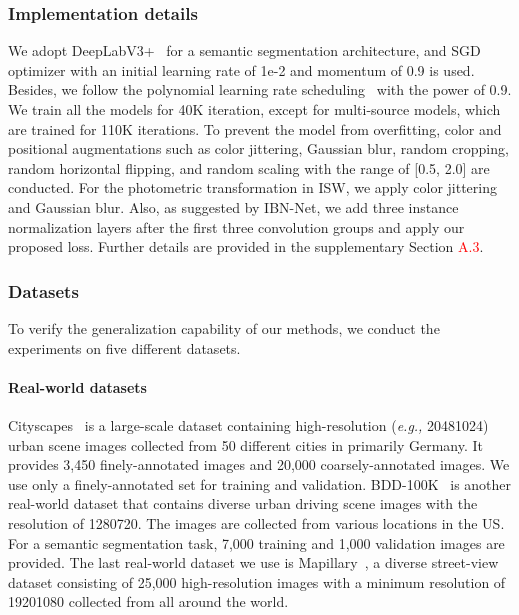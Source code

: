 \documentclass[final]{latex/cvpr}
\newcommand{\todow}[1]{\textcolor{red}{#1}}
\begin{document}
\subsubsection{Implementation details}
\vspace{-0.1cm}
We adopt DeepLabV3+~\cite{chen2018encoder} for a semantic segmentation architecture, and SGD optimizer with an initial learning rate of 1e-2 and momentum of 0.9 is used. Besides, we follow the polynomial learning rate scheduling~\cite{liu2015parsenet} with the power of 0.9. We train all the models for 40K iteration, except for multi-source models, which are trained for 110K iterations. To prevent the model from overfitting, color and positional augmentations such as color jittering, Gaussian blur, random cropping, random horizontal flipping, and random scaling with the range of [0.5, 2.0] are conducted. For the photometric transformation in ISW, we apply color jittering and Gaussian blur.
Also, as suggested by IBN-Net, we add three instance normalization layers after the first three convolution groups and apply our proposed loss.
Further details are provided in the supplementary Section \todow{A.3}.
\vspace{-0.35cm}
\subsubsection{Datasets}
\vspace{-0.2cm}
To verify the generalization capability of our methods, we conduct the experiments on five different datasets.
\vspace{-0.48cm}
\paragraph{Real-world datasets} Cityscapes~\cite{Cordts2016Cityscapes} is a large-scale dataset containing high-resolution (\textit{e.g.,} 20481024) urban scene images collected from 50 different cities in primarily Germany. It provides 3,450 finely-annotated images and 20,000 coarsely-annotated images. We use only a finely-annotated set for training and validation.
BDD-100K~\cite{yu2020bdd100k} is another real-world dataset that contains diverse urban driving scene images with the resolution of 1280720. The images are collected from various locations in the US. For a semantic segmentation task, 7,000 training and 1,000 validation images are provided.
The last real-world dataset we use is Mapillary~\cite{neuhold2017mapillary}, a diverse street-view dataset consisting of 25,000 high-resolution images with a minimum resolution of 19201080 collected from all around the world.
\end{document}
